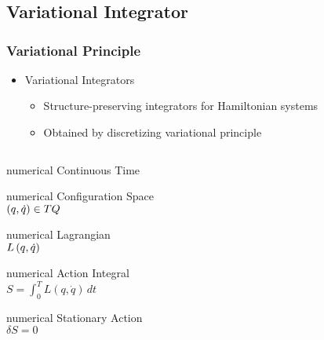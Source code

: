 \section*{}
\subsection*{Variational Integrator}
\begin{frame} %
\frametitle{Variational Principle}
	\begin{itemize}
		\item Variational Integrators
			\begin{itemize}
				\item Structure-preserving integrators for Hamiltonian systems
				\item Obtained by discretizing variational principle
			\end{itemize}
	\end{itemize}
	\begin{columns}[c]
		\begin{column}{0.5\textwidth}
			\centering
			\begin{beamercolorbox}[wd=0.8\columnwidth,sep=0.05cm,center]{numerical} Continuous Time \end{beamercolorbox}
			\begin{beamercolorbox}[wd=0.8\columnwidth,sep=0.05cm,center]{numerical} 
				Configuration Space \\
				\( \left( q, \dot{q}  \right) \in TQ \)
			\end{beamercolorbox}
			\begin{beamercolorbox}[wd=0.8\columnwidth,sep=0.05cm,center]{numerical} 
				Lagrangian \\
				\( L\left( q, \dot{q}  \right) \)
			\end{beamercolorbox}
			\begin{beamercolorbox}[wd=0.8\columnwidth,sep=0.05cm,center]{numerical} 
				Action Integral \\
				\( S = \int_{0}^T L\left( q, \dot{q}\right) \, dt \)
			\end{beamercolorbox}
			\begin{beamercolorbox}[wd=0.8\columnwidth,sep=0.05cm,center]{numerical} 
				Stationary Action \\
				\( \delta S = 0 \)
			\end{beamercolorbox}

\end{column}
\end{columns}
\end{frame}
